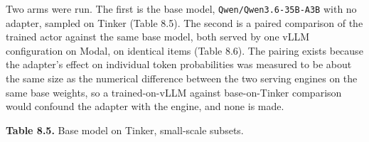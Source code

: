 \documentclass[12pt,a4paper]{report}
\begin{document}
Two arms were run. The first is the base model,
\texttt{Qwen/Qwen3.6-35B-A3B} with no adapter, sampled on Tinker (Table
8.5). The second is a paired comparison of the trained actor against the
same base model, both served by one vLLM configuration on Modal, on
identical items (Table 8.6). The pairing exists because the adapter's
effect on individual token probabilities was measured to be about the
same size as the numerical difference between the two serving engines on
the same base weights, so a trained-on-vLLM against base-on-Tinker
comparison would confound the adapter with the engine, and none is made.

\textbf{Table
8.5.} Base model on Tinker, small-scale subsets.
\end{document}
